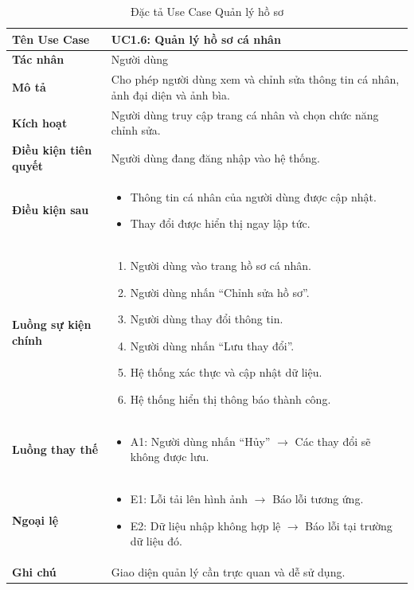 \begin{table}[H]
\centering
\begin{tabularx}{\textwidth}{|l|X|}
\hline
\textbf{Tên Use Case} & \textbf{UC1.6: Quản lý hồ sơ cá nhân} \\ \hline
\textbf{Tác nhân} & Người dùng \\ \hline
\textbf{Mô tả} & Cho phép người dùng xem và chỉnh sửa thông tin cá nhân, ảnh đại diện và ảnh bìa. \\ \hline
\textbf{Kích hoạt} & Người dùng truy cập trang cá nhân và chọn chức năng chỉnh sửa. \\ \hline
\textbf{Điều kiện tiên quyết} & Người dùng đang đăng nhập vào hệ thống. \\ \hline
\textbf{Điều kiện sau} & 
\begin{itemize}
    \item Thông tin cá nhân của người dùng được cập nhật.
    \item Thay đổi được hiển thị ngay lập tức.
\end{itemize} \\ \hline
\textbf{Luồng sự kiện chính} & 
\begin{enumerate}
    \item Người dùng vào trang hồ sơ cá nhân.
    \item Người dùng nhấn ``Chỉnh sửa hồ sơ''.
    \item Người dùng thay đổi thông tin.
    \item Người dùng nhấn ``Lưu thay đổi''.
    \item Hệ thống xác thực và cập nhật dữ liệu.
    \item Hệ thống hiển thị thông báo thành công.
\end{enumerate} \\ \hline
\textbf{Luồng thay thế} & 
\begin{itemize}
    \item A1: Người dùng nhấn ``Hủy'' $\rightarrow$ Các thay đổi sẽ không được lưu.
\end{itemize} \\ \hline
\textbf{Ngoại lệ} & 
\begin{itemize}
    \item E1: Lỗi tải lên hình ảnh $\rightarrow$ Báo lỗi tương ứng.
    \item E2: Dữ liệu nhập không hợp lệ $\rightarrow$ Báo lỗi tại trường dữ liệu đó.
\end{itemize} \\ \hline
\textbf{Ghi chú} & Giao diện quản lý cần trực quan và dễ sử dụng. \\ \hline
\end{tabularx}
\caption{Đặc tả Use Case Quản lý hồ sơ}
\end{table}

